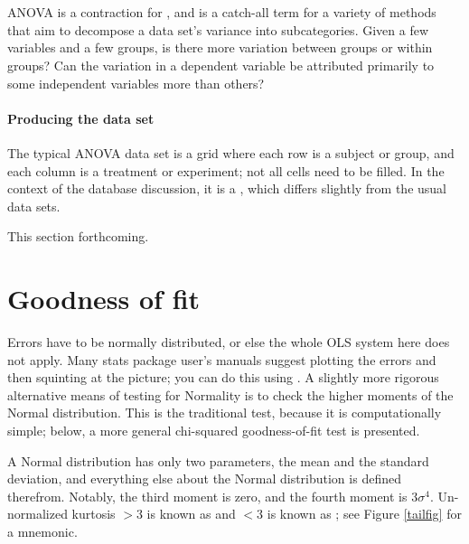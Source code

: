 \section{} ANOVA is a contraction for , and is a catch-all term for a variety of methods that
aim to decompose a data set's variance into subcategories. Given a few
variables and a few groups, is there more variation between groups or
within groups? Can the variation in a dependent variable be attributed
primarily to some independent variables more than others?

\paragraph{Producing the data set} The typical ANOVA data set is a grid
where each row is a subject or group, and each column is a treatment or
experiment; not all cells need to be filled. In the context of the
database discussion, it is a , which differs slightly
from the usual data sets.

This section forthcoming.

\section{Goodness of fit}

Errors have to be normally distributed, or else
the whole OLS system here does not apply. Many stats package user's manuals
suggest plotting the errors and then squinting at the picture; you can
do this using . 
A slightly more rigorous alternative means of testing for Normality
is to check the higher moments of the Normal distribution.  This is the
traditional test, because it is computationally simple; below, a more
general chi-squared goodness-of-fit test is presented.

A Normal distribution has only two parameters, the mean and the
standard deviation, and everything else about the Normal distribution is
defined therefrom. Notably, the third moment is zero, and the fourth
moment is $3 \sigma^4$. 
Un-normalized kurtosis $>3$ is known as  and $<3$ is
known as ; see Figure \ref{tailfig} for a mnemonic.

